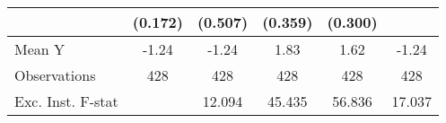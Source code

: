 {\begin{tabular}{l*{5}{c}}
            &     (0.172)         &     (0.507)         &     (0.359)         &     (0.300)         &                     \\
\midrule
Mean Y      &       -1.24         &       -1.24         &        1.83         &        1.62         &       -1.24         \\
Observations&         428         &         428         &         428         &         428         &         428         \\
Exc. Inst. F-stat&                     &      12.094         &      45.435         &      56.836         &      17.037         \\
\bottomrule
\end{tabular}
}
